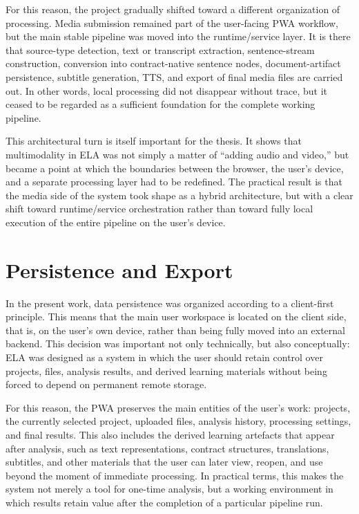\documentclass[12pt,a4paper,oneside]{report}
\begin{document}
For this reason, the project gradually shifted toward a different organization of processing. Media submission remained part of the user-facing PWA workflow, but the main stable pipeline was moved into the runtime/service layer. It is there that source-type detection, text or transcript extraction, sentence-stream construction, conversion into contract-native sentence nodes, document-artifact persistence, subtitle generation, TTS, and export of final media files are carried out. In other words, local processing did not disappear without trace, but it ceased to be regarded as a sufficient foundation for the complete working pipeline.

This architectural turn is itself important for the thesis. It shows that multimodality in ELA was not simply a matter of ``adding audio and video,'' but became a point at which the boundaries between the browser, the user's device, and a separate processing layer had to be redefined. The practical result is that the media side of the system took shape as a hybrid architecture, but with a clear shift toward runtime/service orchestration rather than toward fully local execution of the entire pipeline on the user's device.

\section{Persistence and Export}
In the present work, data persistence was organized according to a client-first principle. This means that the main user workspace is located on the client side, that is, on the user's own device, rather than being fully moved into an external backend. This decision was important not only technically, but also conceptually: ELA was designed as a system in which the user should retain control over projects, files, analysis results, and derived learning materials without being forced to depend on permanent remote storage.

For this reason, the PWA preserves the main entities of the user's work: projects, the currently selected project, uploaded files, analysis history, processing settings, and final results. This also includes the derived learning artefacts that appear after analysis, such as text representations, contract structures, translations, subtitles, and other materials that the user can later view, reopen, and use beyond the moment of immediate processing. In practical terms, this makes the system not merely a tool for one-time analysis, but a working environment in which results retain value after the completion of a particular pipeline run.
\end{document}
